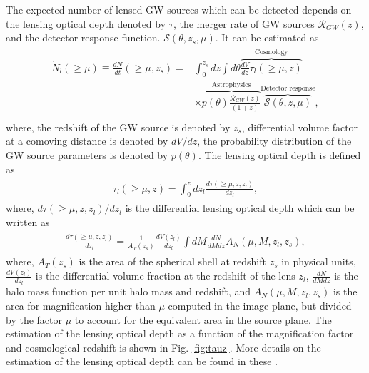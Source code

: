 \documentclass[a4paper,useAMS,usenatbib]{mnras}
\begin{document}
The expected number of lensed GW sources which can be detected depends on the lensing optical depth denoted by $\tau$, the merger rate of GW sources $\mathcal{R}_{GW}(z)$, and the detector response function.  $\mathcal{S}(\theta,z_s, \mu)$. It can be estimated as 
\begin{align}\label{nzl-1}
    \begin{split}
     \dot N_l (\geq \mu) \equiv  \frac{dN}{dt} (\geq \mu, z_s)= & \int_0^{z_s}dz \int d\theta  \overbrace{\frac{dV}{dz} \tau_l(\geq \mu, z)}^{\text{Cosmology}}\\ &\times  \overbrace{p(\theta) \frac{\mathcal{R}_{GW}(z)}{(1+z)}}^{\text{Astrophysics}} \overbrace{\mathcal{S }(\theta,z, \mu)}^{\text{Detector response}} ,\\
           \end{split}
\end{align}
where, the redshift of the GW source is denoted by $z_s$, differential volume factor at a comoving distance is denoted by $dV/dz$, the probability distribution of the GW source parameters is denoted by $p(\theta)$. The lensing optical depth is defined as  
\begin{align}\label{nzl-2}
    \begin{split}
      \tau_l(\geq \mu, z)= \int_0^z dz_l \frac{d\tau(\geq \mu, z, z_l)}{dz_l},
           \end{split}
\end{align}
where, $d\tau(\geq \mu, z, z_l) / dz_l$ %
is the differential lensing optical depth which can be written as \citep{Turner:1984ch}
\begin{align}\label{nzl-2a}
    \begin{split}
     \frac{d\tau(\geq \mu, z, z_l)}{dz_l}= \frac{1}{A_T(z_s)} \frac{dV(z_l)}{dz_l}\int dM \frac{dN}{dMdz} A_N(\mu, M, z_l, z_s),
           \end{split}
\end{align}
where, $A_T(z_s)$ is the area of the spherical shell at redshift $z_s$ in physical units, $\frac{dV(z_l)}{dz_l}$ is the differential volume fraction at the redshift of the lens $z_l$, $\frac{dN}{dMdz}$ is the halo mass function per unit halo mass and redshift, and $A_N(\mu, M, z_l, z_s)$ is the area for magnification higher than $\mu$ computed in the image plane, but divided by the factor $\mu$ to account for the equivalent area in the source plane. The estimation of the lensing optical depth as a function of the magnification factor and cosmological redshift is shown in Fig. \ref{fig:tauz}. {More details on the estimation of the lensing optical depth can be found in these \citep{Watson:2013mea, Diego:2018fzr, Diego:2019rzc}.} 
\end{document}
